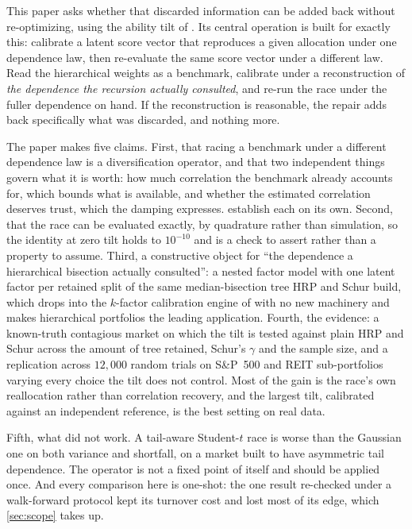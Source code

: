 \documentclass[11pt]{article}
\begin{document}
This paper asks whether that discarded information can be added back without
re-optimizing, using the ability tilt of \textcite{cotton2026polish}. Its
central operation is built for exactly this: calibrate a latent score vector
that reproduces a given allocation under one dependence law, then
re-evaluate the same score vector under a different law. Read the
hierarchical weights as a benchmark, calibrate under a reconstruction of
\emph{the dependence the recursion actually consulted}, and re-run the race
under the fuller dependence on hand. If the reconstruction is reasonable, the
repair adds back specifically what was discarded, and nothing more.

The paper makes five claims. First, that racing a benchmark under a
different dependence law is a diversification operator, and that two
independent things govern what it is worth: how much correlation the benchmark
already accounts for, which bounds what is available, and whether the
estimated correlation deserves trust, which the damping expresses.
 establish each on its own. Second, that the race
can be evaluated exactly, by quadrature rather than simulation, so the
identity at zero tilt holds to $10^{-10}$ and is a check to assert rather than
a property to assume. Third, a constructive object for ``the dependence a
hierarchical bisection actually consulted'': a nested factor model with one
latent factor per retained split of the same median-bisection tree HRP and
Schur build, which drops into the $k$-factor calibration engine of
\textcite{cotton2026factorprobit} with no new machinery and makes hierarchical
portfolios the leading application. Fourth, the evidence: a known-truth
contagious market on which the tilt is tested against plain HRP and Schur
across the amount of tree retained, Schur's $\gamma$ and the sample size, and
a replication across $12{,}000$ random trials on S\&P~500 and REIT
sub-portfolios varying every choice the tilt does not control. Most of the
gain is the race's own reallocation rather than correlation recovery, and the
largest tilt, calibrated against an independent reference, is the best
setting on real data.

Fifth, what did not work. A tail-aware Student-$t$ race is worse than the
Gaussian one on both variance and shortfall, on a market built to have
asymmetric tail dependence. The operator is not a fixed point of itself and
should be applied once. And every comparison here is one-shot: the one result
re-checked under a walk-forward protocol kept its turnover cost and lost most
of its edge, which \cref{sec:scope} takes up.
\end{document}
